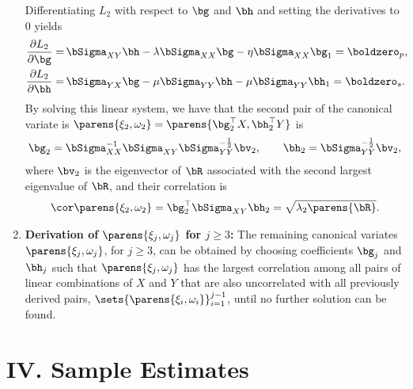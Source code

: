\documentclass[12pt]{article}
\begin{document}
\begin{enumerate}[label=\textbf{\arabic*.}]
	Differentiating $L_2$ with respect to $\bg$ and $\bh$ and setting the derivatives to 0 yields 
	\begin{align}
		\frac{\partial L_2}{\partial \bg} = & \, \bSigma_{XY} \bh - \lambda \bSigma_{XX} \bg - \eta \bSigma_{XX} \bg_1 = \boldzero_p, \\ 
		\frac{\partial L_2}{\partial \bh} = & \, \bSigma_{YX} \bg - \mu \bSigma_{YY} \bh - \mu \bSigma_{YY} \bh_1 = \boldzero_s. 
	\end{align}
	By solving this linear system, we have that the second pair of the canonical variate is $\parens{\xi_2, \omega_2} = \parens{\bg_2^\top X, \bh_2^\top Y}$ is 
	\begin{align}
		\bg_2 = \bSigma_{XX}^{-1} \bSigma_{XY} \bSigma_{YY}^{-\frac{1}{2}} \bv_2, \qquad \bh_2 = \bSigma_{YY}^{-\frac{1}{2}} \bv_2, 
	\end{align}
	where $\bv_2$ is the eigenvector of $\bR$ associated with the second largest eigenvalue of $\bR$, and their correlation is 
	\begin{align}
		\cor \parens{\xi_2, \omega_2} = \bg_2^\top \bSigma_{XY} \bh_2 = \sqrt{\lambda_2 \parens{\bR}}. 
	\end{align}
	
	\item \textbf{Derivation of $\parens{\xi_j, \omega_j}$ for $j \ge 3$:} The remaining canonical variates $\parens{\xi_j, \omega_j}$, for $j \ge 3$, can be obtained by choosing coefficients $\bg_j$ and $\bh_j$ such that $\parens{\xi_j, \omega_j}$ has the largest correlation among all pairs of linear combinations of $X$ and $Y$ that are also uncorrelated with all previously derived pairs, $\sets{\parens{\xi_i, \omega_i}}_{i=1}^{j-1}$, until no further solution can be found.  

\end{enumerate}


\section*{IV. Sample Estimates}
\end{document}
